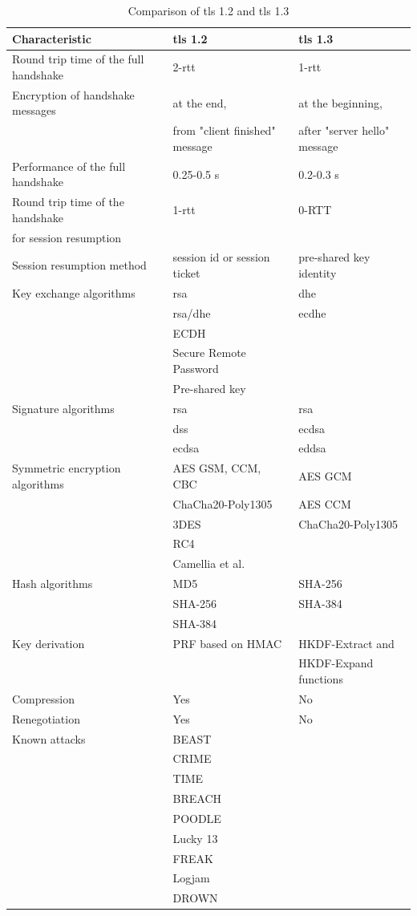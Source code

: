 \begin{table}[H]
	\centering
		\begin{tabular}{lll} \toprule
			\textbf{Characteristic} & \textbf{\gls{tls} 1.2} & \textbf{\gls{tls} 1.3} \\ \midrule
			Round trip time of the full handshake & 2-\gls{rtt} & 1-\gls{rtt} \\ \midrule
			Encryption of handshake messages & at the end, & at the beginning, \\ 
			& from "client finished" message & after "server hello" message \\ \midrule
			Performance of the full handshake & 0.25-0.5 s & 0.2-0.3 s\\ \midrule
			Round trip time of the handshake & 1-\gls{rtt} & 0-RTT \\ 
			for session resumption \\ \midrule
			Session resumption method & session id or session ticket & pre-shared key identity \\ \midrule
			Key exchange algorithms & \gls{rsa} & \gls{dhe}\\ 
			& \gls{rsa}/\gls{dhe} & \gls{ecdhe}\\
			& ECDH \\
			& Secure Remote Password \\
			& Pre-shared key \\ \midrule
			Signature algorithms & \gls{rsa} & \gls{rsa}\\
			& \gls{dss} & \gls{ecdsa}\\
			& \gls{ecdsa} & \gls{eddsa} \\ \midrule
			Symmetric encryption algorithms & AES GSM, CCM, CBC  & AES GCM\\
			& ChaCha20-Poly1305 & AES CCM \\
			& 3DES & ChaCha20-Poly1305 \\
			& RC4 \\
			& Camellia et al.\\ \midrule
			Hash algorithms & MD5 & SHA-256 \\
			& SHA-256 & SHA-384 \\
			& SHA-384 \\ \midrule
			Key derivation & PRF based on HMAC & HKDF-Extract and \\
			& & HKDF-Expand functions \\ \midrule
			Compression & Yes & No \\ \midrule
			Renegotiation & Yes & No \\ \midrule
			Known attacks &  BEAST \\ & CRIME \\ & TIME\\ & BREACH\\ & POODLE\\ & Lucky 13\\ & FREAK\\ & Logjam\\ & DROWN \\ \midrule
		
		\end{tabular}
	\caption{Comparison of \gls{tls} 1.2 and \gls{tls} 1.3}
	\label{tab:comparison}
\end{table}

